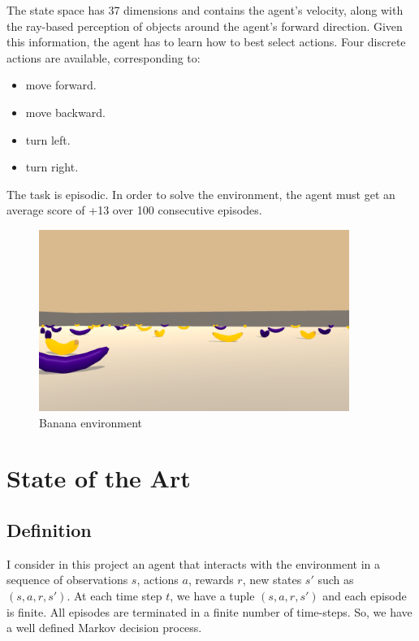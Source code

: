 \documentclass[12pt]{article}
\begin{document}
The state space has 37 dimensions and contains the agent's velocity, along with the ray-based perception of objects around the agent's forward direction. Given this information, the agent has to learn how to best select actions. Four discrete actions are available, corresponding to:

\begin{itemize}
\item move forward.
\item move backward.
\item turn left.
\item turn right.
\end{itemize}
 
The task is episodic. In order to solve the environment, the agent must get an average score of +13 over 100 consecutive episodes.

\begin{figure}[!htbp]
  \includegraphics[width=0.9\textwidth]{../PNG/env.png}
  \caption{Banana environment}
  \label{fig:banana_environment}
\end{figure}

\section{State of the Art}
\subsection{Definition}
I consider in this project an agent that interacts with the environment in a sequence of observations $s$, actions $a$, rewards $r$, new states $s'$ such as $(s,a,r,s')$.
At each time step $t$, we have a tuple $(s,a,r,s')$  and each episode is finite. All episodes are terminated in a finite number of time-steps. 
So, we have a well defined Markov decision process. 
 
\end{document}
